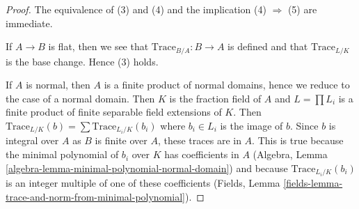 \documentclass[10pt,a4paper]{amsart}
\theoremstyle{plain}
\theoremstyle{definition}
\theoremstyle{remark}
\numberwithin{equation}{subsection}
\begin{document}
\begin{proof}
The equivalence of (3) and (4) and the
implication (4) $\Rightarrow$ (5) are immediate.

\medskip\noindent
If $A \to B$ is flat, then we see that $\text{Trace}_{B/A} : B \to A$ is
defined and that $\text{Trace}_{L/K}$ is the base change. Hence (3) holds.

\medskip\noindent
If $A$ is normal, then $A$ is a finite product of normal domains,
hence we reduce to the case of a normal domain. Then $K$ is
the fraction field of $A$ and $L = \prod L_i$ is a finite product of
finite separable field extensions of $K$. Then
$\text{Trace}_{L/K}(b) = \sum \text{Trace}_{L_i/K}(b_i)$
where $b_i \in L_i$ is the image of $b$.
Since $b$ is integral over $A$ as $B$ is finite over $A$,
these traces are in $A$. This is true because the
minimal polynomial of $b_i$ over $K$ has coefficients in $A$
(Algebra, Lemma \ref{algebra-lemma-minimal-polynomial-normal-domain})
and because $\text{Trace}_{L_i/K}(b_i)$ is an
integer multiple of one of these coefficients
(Fields, Lemma \ref{fields-lemma-trace-and-norm-from-minimal-polynomial}).
\end{proof}
\end{document}
